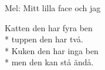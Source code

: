 \begin{SongText}[Benvisa]
    \begin{SongInfo}
        Mel: Mitt lilla face och jag
    \end{SongInfo}
    \begin{SongVerse}
        Katten den har fyra ben\\*%
        tuppen den har två.\\*%
        Kuken den har inga ben\\*%
        men den kan stå ändå.
    \end{SongVerse}
\end{SongText}
